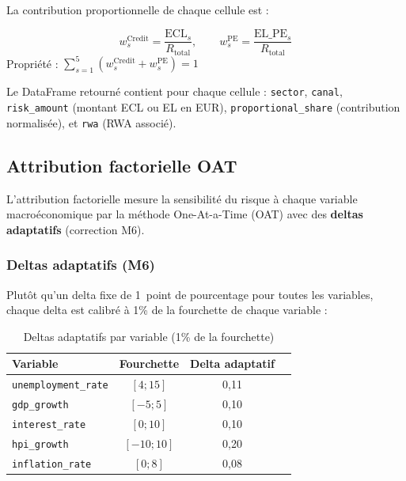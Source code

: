 \documentclass[12pt,a4paper]{article}
\begin{document}
La contribution proportionnelle de chaque cellule est :

\begin{formulebox}
\begin{equation}
    w_{s}^{\text{Credit}} = \frac{\text{ECL}_s}{R_{\text{total}}}, \qquad
    w_{s}^{\text{PE}} = \frac{\text{EL\_PE}_s}{R_{\text{total}}}
    \label{eq:proportional}
\end{equation}
Propri\'et\'e : $\displaystyle\sum_{s=1}^{5} \left( w_s^{\text{Credit}} + w_s^{\text{PE}} \right) = 1$
\end{formulebox}

Le DataFrame retourn\'e contient pour chaque cellule :
\texttt{sector}, \texttt{canal}, \texttt{risk\_amount} (montant ECL ou EL en EUR),
\texttt{proportional\_share} (contribution normalis\'ee), et \texttt{rwa} (RWA associ\'e).

\subsection{Attribution factorielle OAT}

L'attribution factorielle mesure la sensibilit\'e du risque \`a chaque variable
macro\-\'economique par la m\'ethode One-At-a-Time (OAT) avec des
\textbf{deltas adaptatifs} (correction M6).

\subsubsection{Deltas adaptatifs (M6)}

Plut\^ot qu'un delta fixe de 1~point de pourcentage pour toutes les variables,
chaque delta est calibr\'e \`a 1\% de la fourchette de chaque variable :

\begin{table}[htbp]
\centering
\caption{Deltas adaptatifs par variable (1\% de la fourchette)}
\begin{tabular}{lccr}
\toprule
\textbf{Variable} & \textbf{Fourchette} & \textbf{Delta adaptatif} \\
\midrule
\texttt{unemployment\_rate} & $[4 ; 15]$ & 0,11 \\
\texttt{gdp\_growth} & $[-5 ; 5]$ & 0,10 \\
\texttt{interest\_rate} & $[0 ; 10]$ & 0,10 \\
\texttt{hpi\_growth} & $[-10 ; 10]$ & 0,20 \\
\texttt{inflation\_rate} & $[0 ; 8]$ & 0,08 \\
\bottomrule
\end{tabular}
\label{tab:adaptive_deltas}
\end{table}
\end{document}
